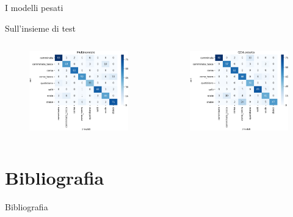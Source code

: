 \documentclass{beamer}
\begin{document}
\begin{frame}{I modelli pesati}

\end{frame}

\begin{frame}{Sull'insieme di test}
\begin{columns}[T] %
\begin{column}{.5\textwidth}
\begin{figure}[H]
\includegraphics[width=\textwidth]{../figure/confusionMatrix-Mn-test.png}
\end{figure}
\end{column}%
\hfill%
\begin{column}{.5\textwidth}
\begin{figure}[H]
\includegraphics[width=\textwidth]{../figure/confusionMatrix-QDA-penalizzata-test.png}
\end{figure}
\end{column}%
\end{columns}
\end{frame}

\section{Bibliografia}
\begin{frame}{Bibliografia}
\printbibliography
\end{frame}
\end{document}
